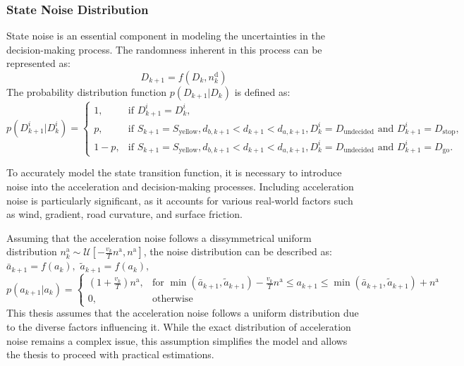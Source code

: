 \subsubsection{State Noise Distribution}\label{State noise distribution}
State noise is an essential component in modeling the uncertainties in the decision-making process. The randomness inherent in this process can be represented as:
\begin{equation}
    D_{k+1} = f (D_k, n_k^\text{d})
\end{equation}
The probability distribution function $p(D_{k+1}|D_k)$ is defined as:
\begin{equation}
p(D_{k+1}^i | D_k^i) =
\begin{cases}
1, & \text{if } D_{k+1}^i = D_k^i, \\
p, & \text{if } S_{k+1} = S_{\text{yellow}}, d_{b, k+1} < d_{k+1} < d_{a, k+1}, D_k^i = D_{\text{undecided}} \text{ and } D_{k+1}^i = D_{\text{stop}}, \\
1 - p, & \text{if } S_{k+1} = S_{\text{yellow}}, d_{b, k+1} < d_{k+1} < d_{a, k+1}, D_k^i = D_{\text{undecided}} \text{ and } D_{k+1}^i = D_{\text{go}}. 
\end{cases}
\end{equation}

To accurately model the state transition function, it is necessary to introduce noise into the acceleration and decision-making processes. Including acceleration noise is particularly significant, as it accounts for various real-world factors such as wind, gradient, road curvature, and surface friction.

Assuming that the acceleration noise follows a dissymmetrical uniform distribution $n_k^\text{a} \sim \mathcal{U}[-\frac{v_k}{T}n^\text{a}, n^\text{a}]$, the noise distribution can be described as:\\
$\bar a_{k+1} = f(a_k),$
$\tilde a_{k+1} = f(a_k),$
\begin{equation}\label{The acceleration noise probability function}
p(a_{k+1}|a_k) = \begin{cases} 
(1+\frac{v_k}{T})n^\text{a}, & \text{for } \min \left(\bar a_{k+1}, \tilde a_{k+1}\right) - \frac{v_k}{T}n^\text{a}  \leq a_{k+1} \leq \min \left(\bar a_{k+1}, \tilde a_{k+1}\right) + n^\text{a} \\
0, & \text{otherwise} 
\end{cases}
\end{equation}
This thesis assumes that the acceleration noise follows a uniform distribution due to the diverse factors influencing it. While the exact distribution of acceleration noise remains a complex issue, this assumption simplifies the model and allows the thesis to proceed with practical estimations.

